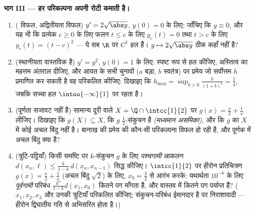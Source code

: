 \begin{problem}[{सप्ताहांत समस्या --- पिकार--लिंडलोफ़
प्रमेय}]
\medskip
\noindent\textbf{भाग III --- हर परिकल्पना अपनी रोटी कमाती है।}
\begin{enumerate}[resume]
  \item ( विफल, अद्वितीयता विफल) $y' =
        2\sqrt{\abs y}$, $y(0) = 0$ के लिए: जाँचिए कि
        $y \equiv 0$, और यह भी कि प्रत्येक $c \geq 0$ के लिए फलन $t \leq c$ के लिए $y_c(t) = 0$ तथा
        $t > c$ के लिए $y_c(t) = (t - c)^2$ --- ये सब $\R$ पर $C^1$ हल हैं। $y \mapsto
        2\sqrt{\abs y}$ ठीक कहाँ
         नहीं है?
  \item (स्थानीयता वास्तविक है) $y' = y^2$, $y(0) = 1$ के लिए: स्पष्ट रूप से हल
        कीजिए, अस्तित्व का महत्तम अंतराल दीजिए, और आयत के सभी चुनावों
        ($a$ बड़ा, $b$ स्वतंत्र) पर प्रमेय जो सर्वोत्तम $h$
        प्रमाणित कर सकती है वह परिकलित कीजिए: दिखाइए कि $h_{\max} = \sup_{b>0} \frac{b}{(1+b)^2} = \frac14$, जबकि
        सच्चा हल $\intoo{-\infty}{1}$ पर रहता है।
  \item (पूर्णता सजावट नहीं है) सामान्य दूरी वाले $X = \Q \cap
        \intcc{1}{2}$ पर $g(x) =
        \frac x2 + \frac1x$ लीजिए।
        दिखाइए कि $g(X) \subseteq X$, कि $g$ $\frac12$-संकुचन है \emph{(मध्यमान
        असमिका)}, और कि $g$ का $X$ में कोई अचल बिंदु नहीं है। बानाख
        की प्रमेय की कौन-सी परिकल्पना विफल हो रही है, और पूर्णक में
        अचल बिंदु क्या है?
  \item (त्रुटि-पट्टियाँ) किसी  समष्टि पर $k$-संकुचन $g$ के लिए
        \emph{पश्चगामी} आकलन $d(x_n,
        \ell) \leq \frac{k}{1-k}\,d(x_n, x_{n-1})$ सिद्ध कीजिए। $\intcc{1}{2}$ पर हीरोन
        प्रतिचित्रण $g(x) = \frac x2 + \frac 1x$ (अचल बिंदु $\sqrt2$) के लिए, $x_0 = \frac32$ से आरंभ करके:
        यथार्थता $10^{-6}$ के लिए \emph{पूर्वगामी} परिबंध $\frac{k^n}{1-k}d(x_1, x_0)$ कितने पग
        माँगता है, और वास्तव में कितने पग पर्याप्त हैं? ($x_1, x_2, x_3$ और उनकी
        त्रुटियाँ परिकलित कीजिए; संकुचन-परिबंध ईमानदार है पर
        निराशावादी --- हीरोन द्विघातीय गति से अभिसरित होता है।)
\end{enumerate}


\end{problem}
